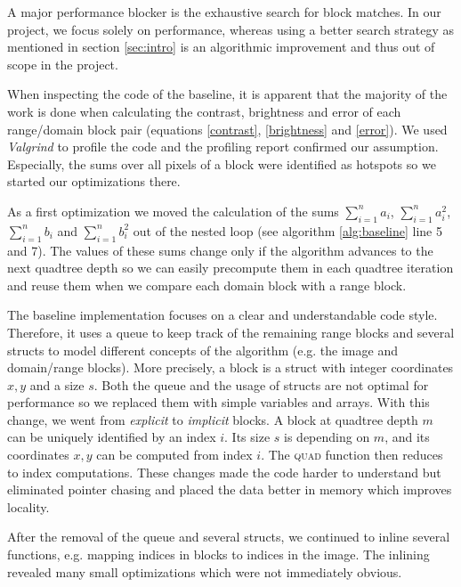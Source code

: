  A major performance blocker is the exhaustive search for block matches.
In our project, we focus solely on performance, 
whereas using a better search strategy as mentioned in section \ref{sec:intro} is an algorithmic improvement
and thus out of scope in the project.

When inspecting the code of the baseline, it is apparent that the majority of the work
is done when calculating the contrast, brightness and error of each range/domain block pair 
(equations \ref{contrast}, \ref{brightness} and \ref{error}). We used \textit{Valgrind} 
\cite{valgrind} to profile the code and the profiling report confirmed our assumption. Especially, the sums
over all pixels of a block were identified as hotspots so we started our optimizations there.

 As a first optimization we moved the calculation of the sums $\sum_{i=1}^n a_i$, 
$\sum_{i=1}^n a_i^2$, $\sum_{i=1}^n b_i$ and $\sum_{i=1}^n b_i^2$ out of the nested loop 
(see algorithm \ref{alg:baseline} line 5 and 7). The values of these sums change only if the algorithm advances
to the next quadtree depth so we can easily precompute them in each quadtree iteration and reuse them when we
compare each domain block with a range block.

The baseline implementation focuses on a clear and understandable code style. Therefore, it uses a queue 
to keep track of the remaining range blocks and several structs to model different concepts of the algorithm 
(e.g. the image and domain/range blocks). More precisely, a block is a struct with integer coordinates $x,y$ and a size $s$. 
Both the queue and the usage of structs are not optimal for performance so we replaced them 
with simple variables and arrays. With this change, we went from \textit{explicit} to \textit{implicit} blocks. 
A block at quadtree depth $m$ can be uniquely identified by an index $i$. Its size $s$ is depending on $m$, 
and its coordinates $x,y$ can be computed from index $i$. The \textsc{quad} function then reduces to index computations. 
These changes made the code harder to understand but eliminated pointer chasing and placed the 
data better in memory which improves locality.

After the removal of the queue and several structs, we continued to inline several functions, e.g. mapping indices in blocks
to indices in the image. The inlining revealed many small optimizations which were not immediately obvious. 

